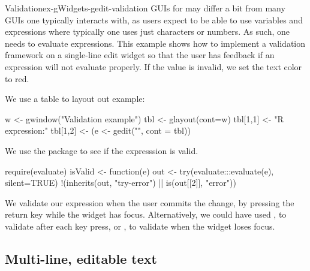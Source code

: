 \begin{example}{Validation}{ex-gWidgets-gedit-validation}
GUIs for \R\/ may differ a bit from many GUIs one typically interacts
with, as \R\/ users expect to be able to use variables and expressions
where typically one uses just characters or numbers. As such, one
needs to evaluate expressions. This example shows how to implement a
validation framework on a single-line edit widget so that the user has
feedback if an expression will not evaluate properly.  If the value is
invalid, we set the text color to red. 


We use a table to layout out example:
\begin{Schunk}
\begin{Sinput}
 w <- gwindow("Validation example")
 tbl <- glayout(cont=w)
 tbl[1,1] <- "R expression:"
 tbl[1,2] <- (e <- gedit("", cont = tbl))
\end{Sinput}
\end{Schunk}


We use the  package to see if the expresssion is valid.
\begin{Schunk}
\begin{Sinput}
 require(evaluate)
 isValid <- function(e) {
   out <- try(evaluate:::evaluate(e), silent=TRUE)
   !(inherits(out, "try-error") || 
     is(out[[2]], "error"))
 }
\end{Sinput}
\end{Schunk}
%

We validate our expression when the user commits the change, by
pressing the return key while the widget has focus. Alternatively, we
could have used
, to validate after each key press, or
, to validate when the widget loses focus.

\begin{Schunk}
\end{Schunk}

\end{example}

\subsection{Multi-line, editable text}
\label{sec:gWidgets-multi-line-editable}

